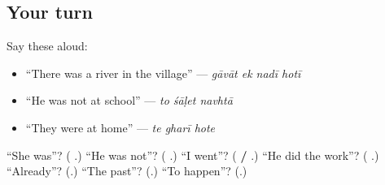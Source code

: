\subsection*{Your turn}
Say these aloud:

\begin{itemize}
\raggedright
  \item \textquotedblleft{}There was a river in the village\textquotedblright{} — \emph{gāvāt ek nadī hotī}
  \item \textquotedblleft{}He was not at school\textquotedblright{} — \emph{to śāḷet navhtā}
  \item \textquotedblleft{}They were at home\textquotedblright{} — \emph{te gharī hote}
\end{itemize}

\begin{tcolorbox}[breakable,colback=teal!4,colframe=teal!35!black,title={Before you move on}]
\textquotedblleft{}She was\textquotedblright{}? (\textbf{ }.) \textquotedblleft{}He was not\textquotedblright{}? (\textbf{ }.) \textquotedblleft{}I went\textquotedblright{}? (\textbf{  / }.) \textquotedblleft{}He did the work\textquotedblright{}? (\textbf{  }.) \textquotedblleft{}Already\textquotedblright{}? (\textbf{}.) \textquotedblleft{}The past\textquotedblright{}? (\textbf{}.) \textquotedblleft{}To happen\textquotedblright{}? (\textbf{}.)
\end{tcolorbox}
